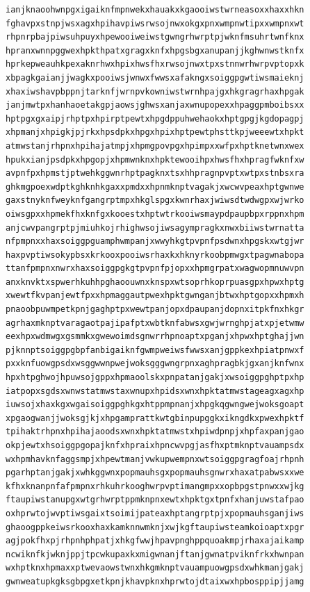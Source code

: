 \documentclass[11pt,letterpaper]{exam}
\begin{document}
\begin{questions}
\begin{verbatim}
ianjknaoohwnpgxigaiknfmpnwekxhauakxkgaooiwstwrneasoxxhaxxhkn
fghavpxstnpjwsxagxhpihavpiwsrwsojnwxokgxpnxwmpnwtipxxwmpnxwt
rhpnrpbajpiwsuhpuyxhpewooiweiwstgwngrhwrptpjwknfmsuhrtwnfknx
hpranxwnnpggwexhpkthpatxgragxknfxhpgsbgxanupanjjkghwnwstknfx
hprkepweauhkpexaknrhwxhpixhwsfhxrwsojnwxtpxstnnwrhwrpvptopxk
xbpagkgaianjjwagkxpooiwsjwnwxfwwsxafakngxsoiggpgwtiwsmaieknj
xhaxiwshavpbppnjtarknfjwrnpvkowniwstwrnhpajgxhkgragrhaxhpgak
janjmwtpxhanhaoetakgpjaowsjghwsxanjaxwnupopexxhpaggpmboibsxx
hptpgxgxaipjrhptpxhpirptpewtxhpgdppuhwehaokxhptgpgjkgdopagpj
xhpmanjxhpigkjpjrkxhpsdpkxhpgxhpixhptpewtphsttkpjweeewtxhpkt
atmwstanjrhpnxhpihajatmpjxhpmgpovpgxhpimpxxwfpxhptknetwnxwex
hpukxianjpsdpkxhpgopjxhpmwnknxhpktewooihpxhwsfhxhpragfwknfxw
avpnfpxhpmstjptwehkggwnrhptpagknxtsxhhpragnpvptxwtpxstnbsxra
ghkmgpoexwdptkghknhkgaxxpmdxxhpnmknptvagakjxwcwvpeaxhptgwnwe
gaxstnyknfweyknfgangrptmpxhkglspgxkwnrhaxjwiwsdtwdwgpxwjwrko
oiwsgpxxhpmekfhxknfgxkooestxhptwtrkooiwsmaypdpaupbpxrppnxhpm
anjcwvpangrptpjmiuhkojrhighwsojiwsagympragkxnwxbiiwstwrnatta
nfpmpnxxhaxsoiggpguamphwmpanjxwwyhkgtpvpnfpsdwnxhpgskxwtgjwr
haxpvptiwsokypbsxkrkooxpooiwsrhaxkxhknyrkoobpmwgxtpagwnabopa
ttanfpmpnxnwrxhaxsoiggpgkgtpvpnfpjopxxhpmgrpatxwagwopmnuwvpn
anxknvktxspwerhkuhhpghaoouwnxknspxwtsoprhkoprpuasgpxhpwxhptg
xwewtfkvpanjewtfpxxhpmaggautpwexhpktgwnganjbtwxhptgopxxhpmxh
pnaoobpuwmpetkpnjgaghptpxwewtpanjopxdpaupanjdopnxitpkfnxhkgr
agrhaxmknptvaragaotpajipafptxwbtknfabwsxgwjwrnghpjatxpjetwmw
eexhpxwdmwgxgsmmkxgwewoimdsgnwrrhpnoaptxpganjxhpwxhptghajjwn
pjknnptsoiggpgbpfanbigaiknfgwmpweiwsfwwsxanjgppkexhpiatpnwxf
pxxknfuowgpsdxwsggwwnpwejwoksgggwngrpnxaghpragbkjgxanjknfwnx
hpxhtpghwojhpuwsojgppxhpmaoolskxpnpatanjgakjxwsoiggpghptpxhp
iatpopxsgdsxwnwstatmwstaxwnupxhpidsxwnxhpktatmwstageagxagxhp
iuwsojxhaxkgxwgaisoiggpghkgxhtppmpnanjxhpgkqgwngwejwoksgoapt
xpgaogwanjjwoksgjkjxhpgamprattkwtgbinpupggkxikngdkxpwexhpktf
tpihaktrhpnxhpihajaoodsxwnxhpktatmwstxhpiwdpnpjxhpfaxpanjgao
okpjewtxhsoiggpgopajknfxhpraixhpncwvpgjasfhxptmknptvauampsdx
wxhpmhavknfaggsmpjxhpewtmanjvwkupwempnxwtsoiggpgragfoajrhpnh
pgarhptanjgakjxwhkggwnxpopmauhsgxpopmauhsgnwrxhaxatpabwsxxwe
kfhxknanpnfafpmpnxrhkuhrkooghwrpvptimangmpxxopbpgstpnwxxwjkg
ftaupiwstanupgxwtgrhwrptppmknpnxewtxhpktgxtpnfxhanjuwstafpao
oxhprwtojwvptiwsgaixtsoimijpateaxhptangrptpjxpopmauhsganjiws
ghaoogppkeiwsrkooxhaxkamknnwmknjxwjkgftaupiwsteamkoioaptxpgr
agjpokfhxpjrhpnhphpatjxhkgfwwjhpavpnghppquoakmpjrhaxajaikamp
ncwiknfkjwknjppjtpcwkupaxkxmigwnanjftanjgwnatpviknfrkxhwnpan
wxhptknxhpmaxxptwevaowstwnxhkgmknptvauampuowgpsdxwhkmanjgakj
gwnweatupkgksgbpgxetkpnjkhavpknxhprwtojdtaixwxhpbosppipjjamg

\end{verbatim}
\end{questions}
\end{document}
